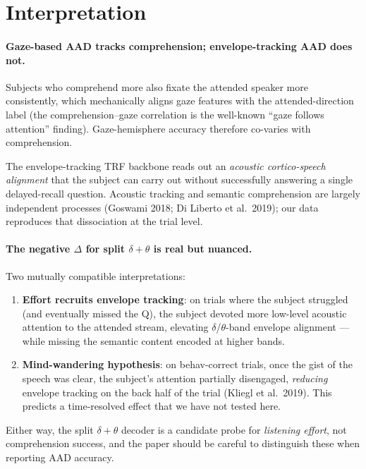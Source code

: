 \section{Interpretation}

\paragraph{Gaze-based AAD tracks comprehension; envelope-tracking AAD
does not.} Subjects who comprehend more also fixate the attended speaker
more consistently, which mechanically aligns gaze features with the
attended-direction label (the comprehension--gaze correlation is the
well-known ``gaze follows attention'' finding). Gaze-hemisphere
accuracy therefore co-varies with comprehension.

The envelope-tracking TRF backbone reads out an \emph{acoustic
cortico-speech alignment} that the subject can carry out without
successfully answering a single delayed-recall question. Acoustic
tracking and semantic comprehension are largely independent processes
(Goswami 2018; Di Liberto et al.\ 2019); our data reproduces that
dissociation at the trial level.

\paragraph{The negative $\Delta$ for split $\delta+\theta$ is real but
nuanced.} Two mutually compatible interpretations:

\begin{enumerate}
  \item \textbf{Effort recruits envelope tracking}: on trials where the
        subject struggled (and eventually missed the Q), the subject
        devoted more low-level acoustic attention to the attended
        stream, elevating $\delta$/$\theta$-band envelope alignment ---
        while missing the semantic content encoded at higher bands.
  \item \textbf{Mind-wandering hypothesis}: on behav-correct trials,
        once the gist of the speech was clear, the subject's attention
        partially disengaged, \emph{reducing} envelope tracking on the
        back half of the trial (Kliegl et al.\ 2019). This predicts a
        time-resolved effect that we have not tested here.
\end{enumerate}

Either way, the split $\delta+\theta$ decoder is a candidate probe for
\emph{listening effort}, not comprehension success, and the paper
should be careful to distinguish these when reporting AAD accuracy.

